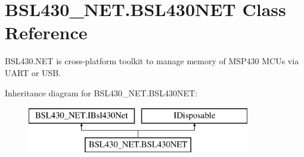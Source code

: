 \hypertarget{class_b_s_l430___n_e_t_1_1_b_s_l430_n_e_t}{}\section{B\+S\+L430\+\_\+\+N\+E\+T.\+B\+S\+L430\+N\+ET Class Reference}
\label{class_b_s_l430___n_e_t_1_1_b_s_l430_n_e_t}


B\+S\+L430.\+N\+ET is cross-\/platform toolkit to manage memory of M\+S\+P430 M\+C\+Us via U\+A\+RT or U\+SB.  


Inheritance diagram for B\+S\+L430\+\_\+\+N\+E\+T.\+B\+S\+L430\+N\+ET\+:\begin{figure}[H]
\begin{center}
\leavevmode
\includegraphics[height=2.000000cm]{class_b_s_l430___n_e_t_1_1_b_s_l430_n_e_t}
\end{center}
\end{figure}

